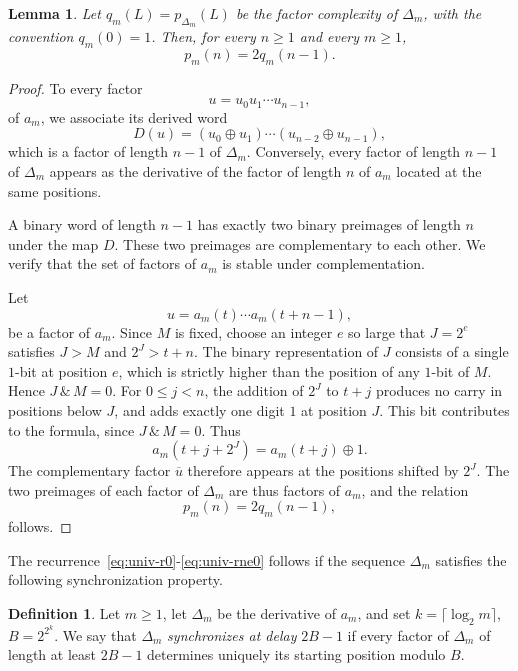 \documentclass[12pt,reqno]{article}
\theoremstyle{plain}
\newtheorem{lemma}[theorem]{Lemma}
\theoremstyle{definition}
\newtheorem{definition}[theorem]{Definition}
\begin{document}
\begin{lemma}
\label{lem:complexity-derivative-general}
Let $q_m(L) = p_{\Delta_m}(L)$ be the factor complexity of $\Delta_m$, with the convention $q_m(0)=1$. Then, for every $n \ge 1$ and every $m \ge 1$,
\[
        p_m(n) = 2q_m(n-1).
\]
\end{lemma}

\begin{proof}
To every factor
\[
  u = u_0 u_1 \cdots u_{n-1},
\]
of $a_m$, we associate its derived word
\[
  D(u) = (u_0 \oplus u_1) \cdots (u_{n-2} \oplus u_{n-1}),
\]
which is a factor of length $n-1$ of $\Delta_m$. Conversely, every factor of length $n-1$ of $\Delta_m$ appears as the derivative of the factor of length $n$ of $a_m$ located at the same positions.

A binary word of length $n-1$ has exactly two binary preimages of length $n$ under the map $D$. These two preimages are complementary to each other. We verify that the set of factors of $a_m$ is stable under complementation.

Let
\[
  u = a_m(t) \cdots a_m(t+n-1),
\]
be a factor of $a_m$. Since $M$ is fixed, choose an integer $e$ so large that $J = 2^e$ satisfies $J > M$ and $2^J > t + n$. The binary representation of $J$ consists of a single $1$-bit at position $e$, which is strictly higher than the position of any $1$-bit of $M$. Hence $J \,\&\, M = 0$. For $0 \le j < n$, the addition of $2^J$ to $t + j$ produces no carry in positions below $J$, and adds exactly one digit $1$ at position $J$. This bit contributes to the formula, since $J \,\&\, M = 0$. Thus
\[
  a_m(t + j + 2^J) = a_m(t + j) \oplus 1.
\]
The complementary factor $\overline{u}$ therefore appears at the positions shifted by $2^J$. The two preimages of each factor of $\Delta_m$ are thus factors of $a_m$, and the relation
\[
  p_m(n) = 2 q_m(n-1),
\]
follows.
\end{proof}

The recurrence~\eqref{eq:univ-r0}-\eqref{eq:univ-rne0} follows if the sequence $\Delta_m$ satisfies the following synchronization property.

\begin{definition}
Let $m \ge 1$, let $\Delta_m$ be the derivative of $a_m$, and set $k = \lceil \log_2 m \rceil$, $B = 2^{2^k}$. We say that $\Delta_m$ \emph{synchronizes at delay} $2B - 1$ if every factor of $\Delta_m$ of length at least $2B - 1$ determines uniquely its starting position modulo $B$.
\end{definition}
\end{document}
